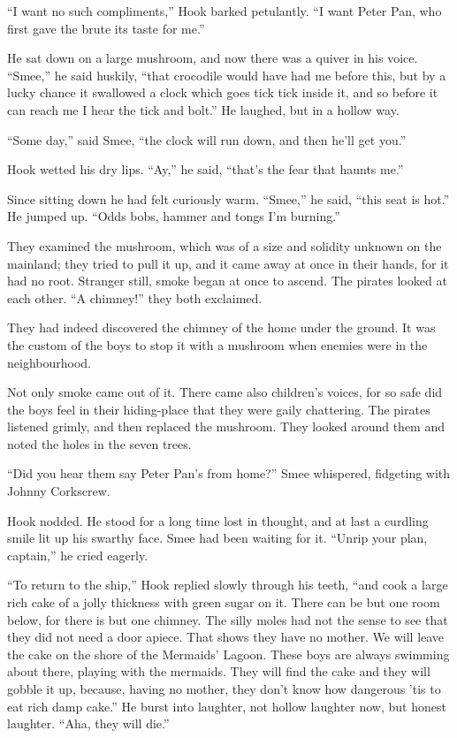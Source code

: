 ``I want no such compliments,'' Hook barked petulantly. ``I want Peter
Pan, who first gave the brute its taste for me.''

He sat down on a large mushroom, and now there was a quiver in his
voice. ``Smee,'' he said huskily, ``that crocodile would have had me
before this, but by a lucky chance it swallowed a clock which goes tick
tick inside it, and so before it can reach me I hear the tick and
bolt.'' He laughed, but in a hollow way.

``Some day,'' said Smee, ``the clock will run down, and then he'll get
you.''

Hook wetted his dry lips. ``Ay,'' he said, ``that's the fear that haunts
me.''

Since sitting down he had felt curiously warm. ``Smee,'' he said, ``this
seat is hot.'' He jumped up. ``Odds bobs, hammer and tongs I'm burning.''

They examined the mushroom, which was of a size and solidity unknown on
the mainland; they tried to pull it up, and it came away at once in
their hands, for it had no root. Stranger still, smoke began at once to
ascend. The pirates looked at each other. ``A chimney!'' they both
exclaimed.

They had indeed discovered the chimney of the home under the ground. It
was the custom of the boys to stop it with a mushroom when enemies were
in the neighbourhood.

Not only smoke came out of it. There came also children's voices, for
so safe did the boys feel in their hiding-place that they were gaily
chattering. The pirates listened grimly, and then replaced the
mushroom. They looked around them and noted the holes in the seven
trees.

``Did you hear them say Peter Pan's from home?'' Smee whispered,
fidgeting with Johnny Corkscrew.

Hook nodded. He stood for a long time lost in thought, and at last a
curdling smile lit up his swarthy face. Smee had been waiting for it.
``Unrip your plan, captain,'' he cried eagerly.

``To return to the ship,'' Hook replied slowly through his teeth, ``and
cook a large rich cake of a jolly thickness with green sugar on it.
There can be but one room below, for there is but one chimney. The
silly moles had not the sense to see that they did not need a door
apiece. That shows they have no mother. We will leave the cake on the
shore of the Mermaids' Lagoon. These boys are always swimming about
there, playing with the mermaids. They will find the cake and they will
gobble it up, because, having no mother, they don't know how dangerous
'tis to eat rich damp cake.'' He burst into laughter, not hollow
laughter now, but honest laughter. ``Aha, they will die.''

